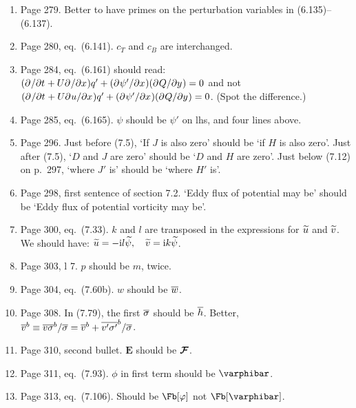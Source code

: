 \documentclass[10pt]{article}
\newcommand{\eq}{eq.\ } \newcommand{\Eq}{Eq.\ }
\begin{document}
\begin{enumerate}
\item Page 279. Better to have primes on the perturbation variables in (6.135)--(6.137). 

\item Page 280, \eq (6.141). $c_T$ and $c_B$ are interchanged.


\item Page 284, \eq (6.161) should read: $(\ppp{}t + U \ppp {}  x) q' + (\ppp{\psi'} x)( \ppp Q y) = 0 $ and not $(\ppp{}t + U \ppp u x) q' + (\ppp{\psi'}x) ( \ppp Q y )= 0 $. (Spot the difference.)

\item Page 285, \eq (6.165). $\psi$ should be $\psi'$ on lhs, and four lines above. 
 
\item Page 296. Just before (7.5), `If $J$ is also zero' should be `if $H$ is also zero'. Just after (7.5), `$D$ and $J$ are zero' should be `$D$ and $H$ are zero'. Just below (7.12) on p.\ 297, `where $J'$ is' should be `where $H'$ is'.

\item Page 298, first sentence of section 7.2. `Eddy flux of potential may be' should be `Eddy flux of potential vorticity may be'.

\item Page 300, \eq (7.33). $k$ and $l$ are transposed in the expressions for $\util$ and $\vtil$. We should have:
     $  \util  =  - \ir l \psitil,  \quad \vtil = \ir k \psitil$. 

\item Page 303, l 7. $p$ should be $m$, twice. 

\item Page 304, \eq (7.60b). $w$ should be $\wbar$. 

\item Page 308. In (7.79), the first $\sigmabar$ should be $\hbarr$. Better, 
$\obar[b]v \equiv  \obar[b]{v \sigma}/\sigmabar =  \obar[b] v + \obar[b]{v'\sigma'} /\sigmabar  $.

\item Page 310, second bullet. $\bm E$ should be $\Fbc$.

\item Page 311, \eq (7.93). $\phi$ in first term should be $\varphibar$.

\item Page 313, \eq (7.106). Should be $\Fb[\varphi]$ not $\Fb[\varphibar]$.


\end{enumerate}
\end{document}
